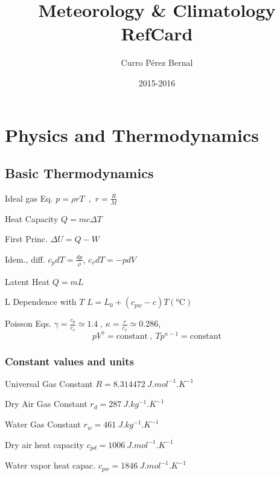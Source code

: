 \documentclass[10pt]{article}
\title{Meteorology \& Climatology RefCard}
\author{Curro Pérez Bernal}
\date{2015-2016}
\renewcommand{\maketitle}{%
{\begin{center}\Large \mythetitle\end{center}}
}
\newcommand{\gc}{\degreeCelsius}
\begin{document}
\begin{multicols}{3}
\maketitle

\section{Physics and Thermodynamics}

\subsection{Basic Thermodynamics}
\begin{ttdesc}[labelwidth=\widthof{\texttt{report}}]
\item[Ideal gas Eq.] $p = \rho r T$~,~$r = \frac{R}{M}$
\item[Heat Capacity] $Q = m c \Delta T$
\item[First Princ.] $\Delta U = Q - W$
\item[Idem., diff.] $c_pdT = \frac{dp}{\rho}$, $c_vdT = -pdV$
\item[Latent Heat] $Q = m L$
\item[L Dependence with $T$] $L=L_0 + (c_{pw}-c) T (\si{\gc})$
\item[Poisson Eqs.] $\gamma = \frac{c_p}{c_v}\simeq 1.4~,~\kappa = \frac{r}{c_v}\simeq 0.286$, 
\begin{displaymath}
  p V^\gamma = \text{constant}~,~T p^{\kappa -1} = \text{constant}
\end{displaymath}
\end{ttdesc}
\subsubsection{Constant values and units}
%
\begin{ttdesc}[labelwidth=\widthof{\ttfamily{letterpaper/a4paper}}]
\item[Universal Gas Constant] $R = \SI{8.314472}{J.mol^{-1}.K^{-1}}$
\item[Dry Air Gas Constant] $r_d = \SI{287}{J.kg^{-1}.K^{-1}}$
\item[Water Gas Constant] $r_w = \SI{461}{J.kg^{-1}.K^{-1}}$
\item[Dry air heat capacity] $c_{pd} = \SI{1006}{J.mol^{-1}.K^{-1}}$
\item[Water vapor heat capac.] $c_{pw} = \SI{1846}{J.mol^{-1}.K^{-1}}$
\end{ttdesc}


\end{multicols}
\end{document}
